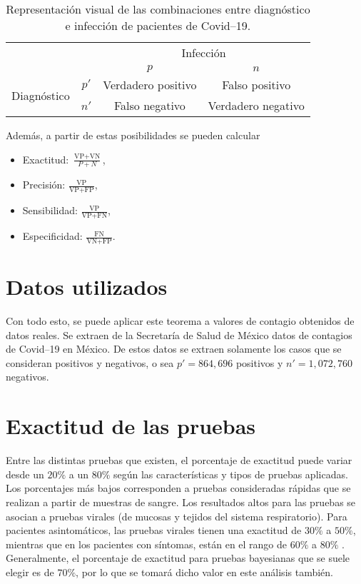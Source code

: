\documentclass[paper=leter, fontsize=11pt]{scrartcl}
\numberwithin{equation}{section}		%
\numberwithin{figure}{section}			%
\numberwithin{table}{section}				%
\begin{document}
\begin{table}[]
    \centering
    \caption{Representación visual de las combinaciones entre diagnóstico e infección de pacientes de Covid--19.}
    \begin{tabular}{cc|c|c|}
    \cline{3-4}
                                                       &      & \multicolumn{2}{c|}{Infección} \\ \cline{3-4} 
                                                       &      & $p$               & $n$        \\ \hline
    \multicolumn{1}{|c|}{\multirow{2}{*}{Diagnóstico}} & $p'$ & Verdadero positivo         & Falso positivo         \\ \cline{2-4} 
    \multicolumn{1}{|c|}{}                             & $n'$ & Falso negativo                & Verdadero negativo         \\ \hline
    \end{tabular}
    \label{posibilidades}
\end{table}

Además, a partir de estas posibilidades se pueden calcular
\begin{itemize}
    \item Exactitud: $\frac{\text{VP} + \text{VN}}{P + N}$,
    \item Precisión: $\frac{\text{VP}}{\text{VP} + \text{FP}}$,
    \item Sensibilidad: $\frac{\text{VP}}{\text{VP} + \text{FN}}$,
    \item Especificidad: $\frac{\text{FN}}{\text{VN} + \text{FP}}$.
\end{itemize}

\section{Datos utilizados}

Con todo esto, se puede aplicar este teorema a valores de contagio obtenidos de datos reales. Se extraen de la Secretaría de Salud de México \citep{gob} datos de contagios de Covid--19 en México. De estos datos se extraen solamente los casos que se consideran positivos y negativos, o sea $p' = 864,696$ positivos y $n' = 1,072,760$ negativos. 

\section{Exactitud de las pruebas}

Entre las distintas pruebas que existen, el porcentaje de exactitud puede variar desde un $20\%$ a un $80\%$ según las características y tipos de pruebas aplicadas. Los porcentajes más bajos corresponden a pruebas consideradas rápidas que se realizan a partir de muestras de sangre. Los resultados altos para las pruebas se asocian a pruebas virales (de mucosas y tejidos del sistema respiratorio). Para pacientes asintomáticos, las pruebas virales tienen una exactitud de $30\%$ a $50\%$, mientras que en los pacientes con síntomas, están en el rango de $60\%$ a $80\%$ \citep{garcia2020, LisboaEA2516}. Generalmente, el porcentaje de exactitud para pruebas bayesianas que se suele elegir es de $70\%$, por lo que se tomará dicho valor en este análisis también.
\end{document}
